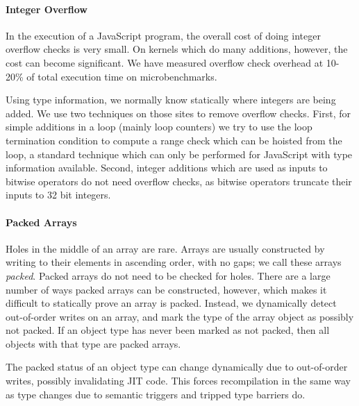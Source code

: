 \paragraph{Integer Overflow}

In the execution of a JavaScript program, the overall cost of doing integer
overflow checks is very small.
On kernels which do many additions, however, the cost can become significant.
We have measured overflow check overhead at 10-20\% of total execution
time on microbenchmarks.

Using type information, we normally know statically where integers are being
added. We use two techniques on those sites to remove overflow checks.
First, for simple additions in a loop (mainly loop counters) we try to use
the loop termination condition to compute a range
check which can be hoisted from the loop, a standard technique \cite{XXX}
which can only be performed for JavaScript with type information available.
Second, integer additions which are used as inputs to bitwise operators
do not need overflow checks, as bitwise operators truncate their inputs to 32
bit integers.

\paragraph{Packed Arrays}

Holes in the middle of an array are rare.
Arrays are usually constructed by writing to their elements in ascending
order, with no gaps; we call these arrays {\it packed}.
Packed arrays do not need to be checked for holes.
There are a large number of ways packed arrays can be constructed, however,
which makes it difficult to statically prove an array is packed.
Instead, we dynamically detect out-of-order writes on an array,
and mark the type of the array object as possibly not packed.
If an object type has never been marked as not packed, then all objects
with that type are packed arrays.


The packed status of an object type can change dynamically due to out-of-order
writes, possibly invalidating JIT code.
This forces recompilation in the same way as type changes due to semantic
triggers and tripped type barriers do.

